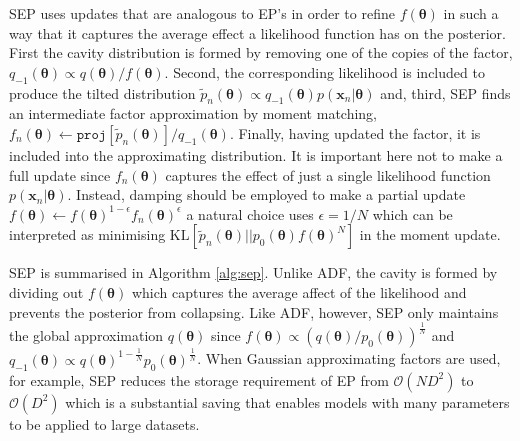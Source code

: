 SEP uses updates that are analogous to EP's in order to refine $f(\bm{\theta})$ in such a way that it captures the average effect a likelihood function has on the posterior. First the cavity distribution is formed by removing one of the copies of the factor, $q_{-1}(\bm{\theta}) \propto q(\bm{\theta})/f(\bm{\theta})$. 
Second, the corresponding likelihood is included to produce the tilted distribution $\tilde{p}_n(\bm{\theta}) \propto q_{-1}(\bm{\theta}) p(\bm{x}_n | \bm{\theta})$ and, third, SEP finds an intermediate factor approximation by moment matching, $f_n(\bm{\theta}) \leftarrow \mathtt{proj}[\tilde{p}_n(\bm{\theta})] / q_{-1}(\bm{\theta}) $. Finally, having updated the factor, it is included into the approximating distribution. It is important here not to make a full update since $f_n(\bm{\theta})$ captures the effect of just a single likelihood function  $p(\bm{x}_n | \bm{\theta})$. Instead, damping should be employed to make a partial update $f(\bm{\theta}) \leftarrow f(\bm{\theta})^{1 - \epsilon} f_n(\bm{\theta})^{\epsilon}$ a natural choice uses $\epsilon = 1/N$ which can be interpreted as minimising  $\mathrm{KL}[\tilde{p}_n(\bm{\theta}) || p_{0}(\bm{\theta})  f(\bm{\theta})^N]$ in the moment update.

SEP is summarised in Algorithm \ref{alg:sep}. Unlike ADF, the cavity is formed by dividing out $f(\bm{\theta})$ which captures the average affect of the likelihood and prevents the posterior from collapsing. Like ADF, however, SEP only maintains the global approximation $q(\bm{\theta})$ since $f(\bm{\theta}) \propto (q(\bm{\theta}) / p_0(\bm{\theta}))^{\frac{1}{N}}$ and $q_{-1}(\bm{\theta}) \propto q(\bm{\theta})^{1 - \frac{1}{N}} p_0(\bm{\theta})^{\frac{1}{N}}$. When Gaussian approximating factors are used, for example, SEP reduces the storage requirement of EP from  $\mathcal{O}(ND^2)$ to $\mathcal{O}(D^2)$ which is a substantial saving that enables models with many parameters to be applied to large datasets. 


